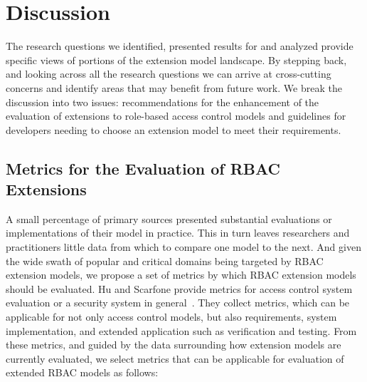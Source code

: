 \section{Discussion} \label{sec:discussion}

The research questions we identified, presented results for and analyzed provide specific views of portions of the extension model landscape. 
By stepping back, and looking across all the research questions we can arrive at cross-cutting concerns and identify areas that may benefit from future work.
We break the discussion into two issues: recommendations for the enhancement of the evaluation of extensions to role-based access control models and guidelines for developers needing to choose an extension model to meet their requirements.

\subsection{Metrics for the Evaluation of RBAC Extensions}

A small percentage of primary sources presented substantial evaluations or implementations of their model in practice.  This in turn leaves researchers and practitioners little data from which to compare one model to the next. And given the wide swath of popular and critical domains being targeted by RBAC extension models, we propose a set of metrics by which RBAC extension models should be evaluated. Hu and Scarfone provide metrics for access control system evaluation or a security system in general~\cite{hu2012:NIST7874}. They collect metrics, which can be applicable for not only access control models, but also requirements, system implementation, and extended application such as verification and testing. From these metrics, and guided by the data surrounding how extension models are currently evaluated, we select metrics that can be applicable for evaluation of extended RBAC models as follows:

